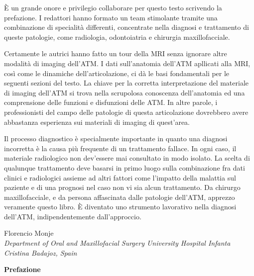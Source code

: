 \documentclass[10pt,twocolumn,a4paper]{article}
\begin{document}
	\vspace*{0.5cm}
	È un grande onore e privilegio collaborare per questo testo scrivendo la prefazione. I redattori hanno formato un team stimolante tramite una combinazione di specialità differenti, concentrate nella diagnosi e trattamento di queste patologie, come
	radiologia, odontoiatria e chirurgia maxillofacciale.\par Certamente le autrici hanno fatto un tour della MRI senza ignorare altre modalità di imaging dell'ATM. I dati sull'anatomia dell'ATM apllicati alla MRI, così come le dinamiche dell'articolazione,
	ci dà le basi fondamentali per le seguenti sezioni del testo. La chiave per la corretta interpretazione del materiale di imaging dell'ATM si trova nella scrupolosa conoscenza dell'anatomia ed una comprensione delle funzioni e disfunzioni delle ATM.
	In altre parole, i professionisti del campo delle patologie di questa articolazione dovrebbero avere abbastanza esperienza sui materiali di imaging di quest'area.\par Il processo diagnostico è specialmente importante in quanto una diagnosi 
	incorretta è la causa più frequente di un trattamento fallace. In ogni caso, il materiale radiologico non dev'essere mai consultato in modo isolato. La scelta di qualunque trattamento deve basarsi in primo luogo sulla combinazione fra dati clinici
	e radiologici assieme ad altri fattori come l'impatto della malattia sul paziente e di una prognosi nel caso non vi sia alcun trattamento. Da chirurgo maxillofacciale, e da persona affascinata dalle patologie dell'ATM, apprezzo veramente questo libro.
	È diventato uno strumento lavorativo nella diagnosi dell'ATM, indipendentemente dall'approccio.
	\begin{flushright}
		Florencio Monje\\
		\textit{\footnotesize{Department of Oral and Maxillofacial Surgery University Hospital Infanta Cristina Badajoz, Spain}}
	\end{flushright}
	
	\newpage
	
	\textbf{\Large{Prefazione}}\\
	
\end{document}
